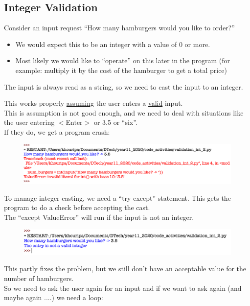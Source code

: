 \documentclass[a4paper,12pt]{article}
\begin{document}
\newpage
\subsection{Integer Validation}
Consider an input request ``How many hamburgers would you like to order?''\\
\begin{itemize}
	\item We would expect this to be an integer with a value of 0 or more.
	\item Most likely we would like to ``operate'' on this later in the program (for example: multiply it by the cost of the hamburger to get a total price)
\end{itemize}
The input is always read as a string, so we need to cast the input to an integer.

This works properly \underline{assuming} the user enters a \underline{valid} input.\\
This is assumption is not good enough, and we need to deal with situations like the user entering $<$Enter$>$ or 3.5 or ``six''.\\
If they do, we get a program crash:
\begin{figure} [!h]
	\centering
	\includegraphics[width=17cm]{screen_shots/validation_int_1.png}
\end{figure}
To manage integer casting, we need a ``try except'' statement. This gets the program to do a check before accepting the cast.\\
The ``except ValueError'' will run if the input is not an integer.

\begin{figure} [!h]
	\centering
	\includegraphics[width=17cm]{screen_shots/validation_int_2.png}
\end{figure}
This partly fixes the problem, but we still don't have an acceptable value for the number of hamburgers.\\
So we need to ask the user again for an input and if we want to ask again (and maybe again ....) we need a loop:
\end{document}
